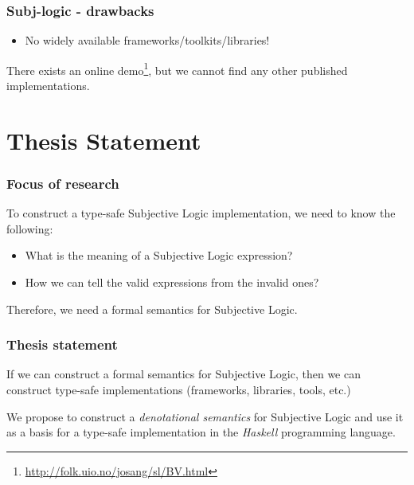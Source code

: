 \documentclass{beamer}
\begin{document}
\begin{frame}
\frametitle{Subj-logic - drawbacks}

\begin{itemize}
  \item No widely available frameworks/toolkits/libraries!
\end{itemize}

There exists an online demo\footnote{\url{http://folk.uio.no/josang/sl/BV.html}},
but we cannot find any other published implementations.

\end{frame}



\section{Thesis Statement}

\begin{frame}
\frametitle{Focus of research}

To construct a type-safe Subjective Logic implementation, we need to know the following:

\begin{itemize}
  \item What is the meaning of a Subjective Logic expression?
  \item How we can tell the valid expressions from the invalid ones?
\end{itemize}

Therefore, we need a formal semantics for Subjective Logic.

\end{frame}

\begin{frame}
\frametitle{Thesis statement}

If we can construct a formal semantics for Subjective Logic, then we can construct
type-safe implementations (frameworks, libraries, tools, etc.)

We propose to construct a \emph{denotational semantics} for Subjective Logic and use it as
a basis for a type-safe implementation in the \emph{Haskell} programming language.

\end{frame}

\end{document}
